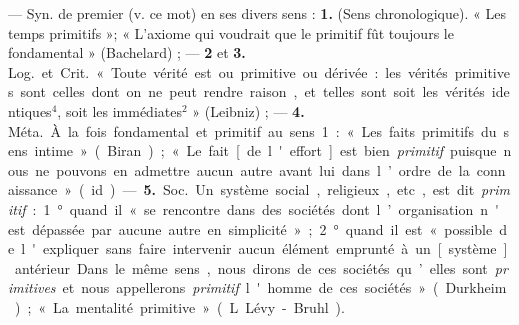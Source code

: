 \begin{itemize}[leftmargin=1cm, label=, itemsep=1pt]
 — Syn. de premier (v. ce mot) en ses divers sens : {\bf 1.}
(Sens chronologique). « Les temps primitifs »; « L’axiome qui voudrait que
le primitif fût toujours le fondamental » (Bachelard) ; — {\bf 2} et
{\bf 3.} \si{Log.} et \si{Crit.} « Toute vérité est ou primitive ou
dérivée : les vérités primitives sont celles dont on ne peut rendre raison,
et telles sont soit les vérités identiques$^4$, soit les immédiates$^2$
» (Leibniz) ; — {\bf 4.} \si{Méta.} À la fois fondamental et primitif au
sens 1 : « Les faits primitifs du sens intime » (Biran) ; « Le fait [de
l'effort] est bien {\it primitif} puisque nous ne pouvons en admettre aucun
autre avant lui dans l’ordre de la connaissance » (id.).

— {\bf 5.} \si{Soc.} Un système social, religieux, etc, est dit
{\it primitif} : 1° quand il « se rencontre dans des sociétés dont
l’organisation n'est dépassée par aucune autre en simplicité » ; 2° quand il
est « possible de l'expliquer sans faire intervenir aucun élément emprunté à
un [système] antérieur. Dans le même sens, nous dirons de ces sociétés
qu’elles sont {\it primitives} et nous appellerons {\it primitif} l'homme de
ces sociétés » (Durkheim) ; « La mentalité primitive » (L. Lévy-Bruhl).


\end{itemize}
